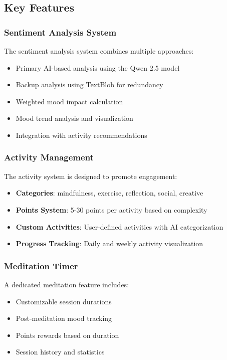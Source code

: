 \documentclass[12pt]{article}
\begin{document}
\subsection{Key Features}

\subsubsection{Sentiment Analysis System}
The sentiment analysis system combines multiple approaches:

\begin{itemize}
    \item Primary AI-based analysis using the Qwen 2.5 model
    \item Backup analysis using TextBlob for redundancy
    \item Weighted mood impact calculation
    \item Mood trend analysis and visualization
    \item Integration with activity recommendations
\end{itemize}

\subsubsection{Activity Management}
The activity system is designed to promote engagement:

\begin{itemize}
    \item \textbf{Categories}: mindfulness, exercise, reflection, social, creative
    \item \textbf{Points System}: 5-30 points per activity based on complexity
    \item \textbf{Custom Activities}: User-defined activities with AI categorization
    \item \textbf{Progress Tracking}: Daily and weekly activity visualization
\end{itemize}

\subsubsection{Meditation Timer}
A dedicated meditation feature includes:

\begin{itemize}
    \item Customizable session durations
    \item Post-meditation mood tracking
    \item Points rewards based on duration
    \item Session history and statistics
\end{itemize}
\end{document}
